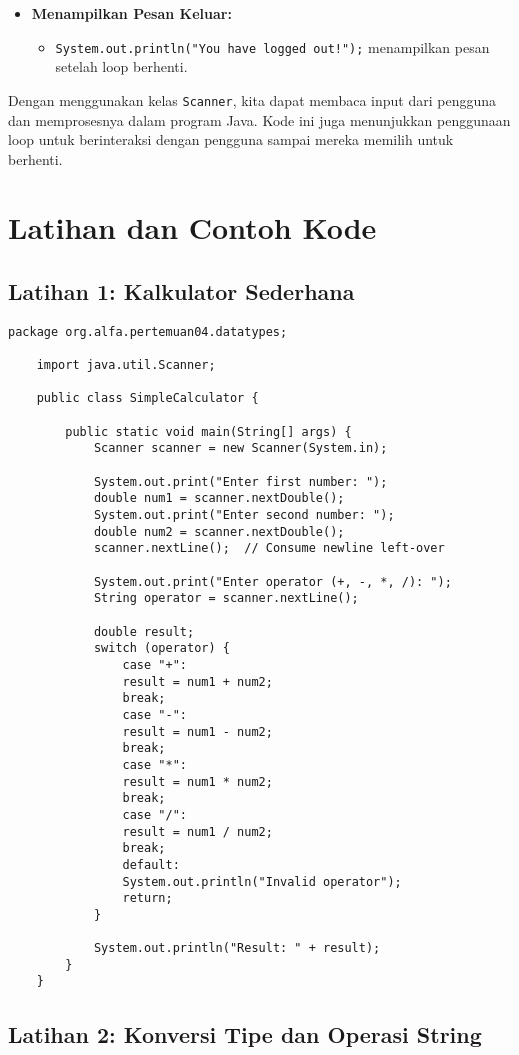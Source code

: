 \begin{itemize}
	\item \textbf{Menampilkan Pesan Keluar:}
	\begin{itemize}
		\item \texttt{System.out.println("You have logged out!");} menampilkan pesan setelah loop berhenti.
	\end{itemize}
\end{itemize}

Dengan menggunakan kelas \texttt{Scanner}, kita dapat membaca input dari pengguna dan memprosesnya dalam program Java. Kode ini juga menunjukkan penggunaan loop untuk berinteraksi dengan pengguna sampai mereka memilih untuk berhenti.

\section{Latihan dan Contoh Kode}

\subsection{Latihan 1: Kalkulator Sederhana}

\begin{lstlisting}[style=JavaStyle, caption={Java Code for Simple Calculator}]
	package org.alfa.pertemuan04.datatypes;
	
	import java.util.Scanner;
	
	public class SimpleCalculator {
		
		public static void main(String[] args) {
			Scanner scanner = new Scanner(System.in);
			
			System.out.print("Enter first number: ");
			double num1 = scanner.nextDouble();
			System.out.print("Enter second number: ");
			double num2 = scanner.nextDouble();
			scanner.nextLine();  // Consume newline left-over
			
			System.out.print("Enter operator (+, -, *, /): ");
			String operator = scanner.nextLine();
			
			double result;
			switch (operator) {
				case "+":
				result = num1 + num2;
				break;
				case "-":
				result = num1 - num2;
				break;
				case "*":
				result = num1 * num2;
				break;
				case "/":
				result = num1 / num2;
				break;
				default:
				System.out.println("Invalid operator");
				return;
			}
			
			System.out.println("Result: " + result);
		}
	}
\end{lstlisting}

\subsection{Latihan 2: Konversi Tipe dan Operasi String}


